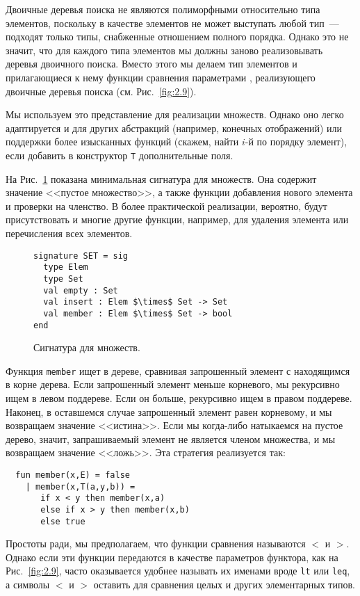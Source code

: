 \begin{remark}
  Двоичные деревья поиска не являются полиморфными относительно типа
  элементов, поскольку в качестве элементов не может выступать любой
  тип~--- подходят только типы, снабженные отношением полного
  порядка. Однако это не значит, что для каждого типа элементов мы
  должны заново реализовывать деревья двоичного поиска. Вместо этого
  мы делаем тип элементов и прилагающиеся к нему функции сравнения
  параметрами , реализующего двоичные деревья
  поиска (см. Рис.~\ref{fig:2.9}).
\end{remark}

Мы используем это представление для реализации множеств. Однако оно
легко адаптируется и для других абстракций (например, конечных
отображений) или поддержки более изысканных функций (скажем, найти
$i$-й по порядку элемент), если добавить в конструктор \lstinline!T!
дополнительные поля.

На Рис.~\ref{fig:2.7} показана минимальная сигнатура для множеств. Она
содержит значение <<пустое множество>>, а также функции добавления
нового элемента и проверки на членство.  В более практической
реализации, вероятно, будут присутствовать и многие другие функции,
например, для удаления элемента или перечисления всех элементов.

\begin{figure}
\begin{lstlisting}
signature SET = sig
  type Elem
  type Set
  val empty : Set
  val insert : Elem $\times$ Set -> Set
  val member : Elem $\times$ Set -> bool
end
\end{lstlisting}
  \caption{Сигнатура для множеств.}
  \label{fig:2.7}
\end{figure}

Функция \lstinline!member! ищет в дереве, сравнивая запрошенный
элемент с находящимся в корне дерева. Если запрошенный элемент меньше
корневого, мы рекурсивно ищем в левом поддереве. Если он больше,
рекурсивно ищем в правом поддереве. Наконец, в оставшемся случае
запрошенный элемент равен корневому, и мы возвращаем значение
<<истина>>. Если мы когда-либо натыкаемся на пустое дерево, значит,
запрашиваемый элемент не является членом множества, и мы возвращаем
значение <<ложь>>.  Эта стратегия реализуется так:
\begin{lstlisting}
  fun member(x,E) = false
    | member(x,T(a,y,b)) =
       if x < y then member(x,a)
       else if x > y then member(x,b)
       else true
\end{lstlisting}
\begin{remark}
  Простоты ради, мы предполагаем, что функции сравнения называются $<$
  и $>$. Однако если эти функции передаются в качестве параметров
  функтора, как на Рис.~\ref{fig:2.9}, часто оказывается удобнее
  называть их именами вроде \lstinline!lt! или \lstinline!leq!, а
  символы $<$ и $>$ оставить для сравнения целых и других элементарных
  типов.
\end{remark}

